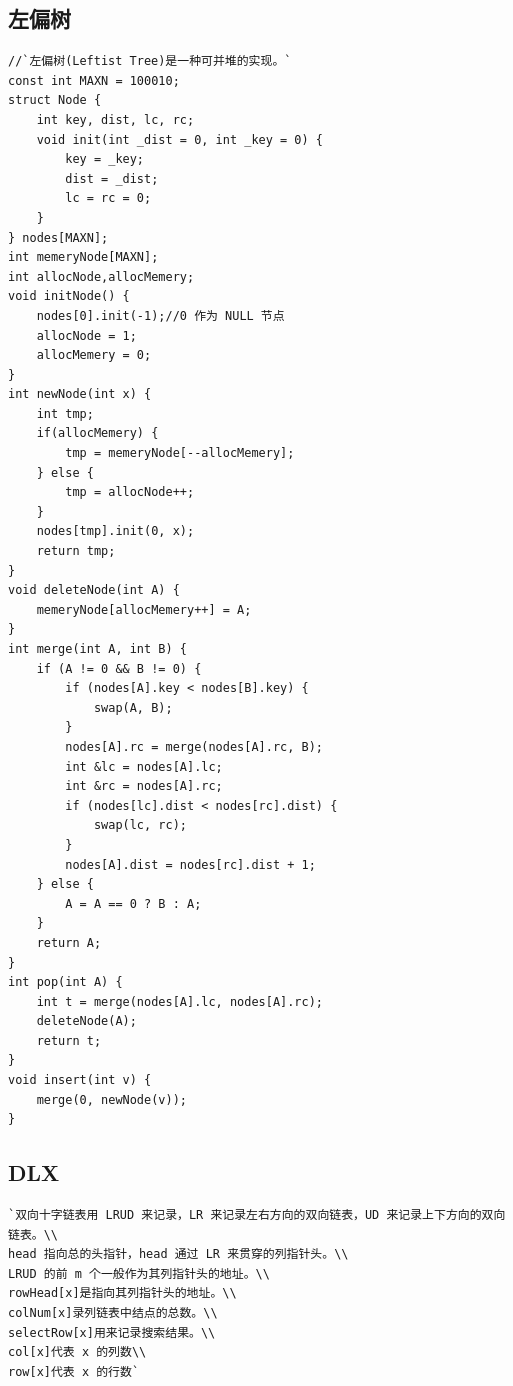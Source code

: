 \documentclass[a4paper]{article}
\begin{document}
\begin{CJK*}{UTF8}{gbsn}
\begin{multicols}{3}
\begin{flushleft}
\subsection{左偏树}
\begin{lstlisting}
//`左偏树(Leftist Tree)是一种可并堆的实现。`
const int MAXN = 100010;
struct Node {
    int key, dist, lc, rc;
    void init(int _dist = 0, int _key = 0) {
        key = _key;
        dist = _dist;
        lc = rc = 0;
    }
} nodes[MAXN];
int memeryNode[MAXN];
int allocNode,allocMemery;
void initNode() {
    nodes[0].init(-1);//0 作为 NULL 节点
    allocNode = 1;
    allocMemery = 0;
}
int newNode(int x) {
    int tmp;
    if(allocMemery) {
        tmp = memeryNode[--allocMemery];
    } else {
        tmp = allocNode++;
    }
    nodes[tmp].init(0, x);
    return tmp;
}
void deleteNode(int A) {
    memeryNode[allocMemery++] = A;
}
int merge(int A, int B) {
    if (A != 0 && B != 0) {
        if (nodes[A].key < nodes[B].key) {
            swap(A, B);
        }
        nodes[A].rc = merge(nodes[A].rc, B);
        int &lc = nodes[A].lc;
        int &rc = nodes[A].rc;
        if (nodes[lc].dist < nodes[rc].dist) {
            swap(lc, rc);
        }
        nodes[A].dist = nodes[rc].dist + 1;
    } else {
        A = A == 0 ? B : A;
    }
    return A;
}
int pop(int A) {
    int t = merge(nodes[A].lc, nodes[A].rc);
    deleteNode(A);
    return t;
}
void insert(int v) {
    merge(0, newNode(v));
}
\end{lstlisting}

\subsection{DLX}
\begin{lstlisting}
`双向十字链表用 LRUD 来记录，LR 来记录左右方向的双向链表，UD 来记录上下方向的双向链表。\\
head 指向总的头指针，head 通过 LR 来贯穿的列指针头。\\
LRUD 的前 m 个一般作为其列指针头的地址。\\
rowHead[x]是指向其列指针头的地址。\\
colNum[x]录列链表中结点的总数。\\
selectRow[x]用来记录搜索结果。\\
col[x]代表 x 的列数\\
row[x]代表 x 的行数`


\end{lstlisting}
\end{flushleft}
\end{multicols}
\end{CJK*}
\end{document}
